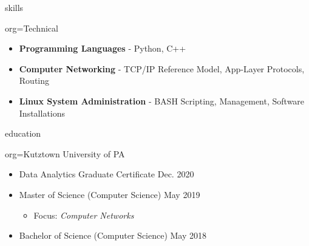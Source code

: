\documentclass{resume}
\begin{document}
\begin{ResumeSection}{skills}
    \newcommand{\skill}[2]{\textbf{#1} - #2}
    \begin{ResumeSubsection}{org=Technical}
        \begin{itemize}
            \item \skill{Programming Languages}{Python, C++}
            \item \skill{Computer Networking}{TCP/IP Reference Model, App-Layer Protocols, Routing}
            \item \skill{Linux System Administration}{BASH Scripting, Management, Software Installations}
        \end{itemize}
    \end{ResumeSubsection}
\end{ResumeSection}

\begin{ResumeSection}{education}
    \begin{ResumeSubsection}{org={Kutztown University of PA}}
        \begin{itemize}
            \item Data Analytics Graduate Certificate \hfill Dec. 2020
            \item Master of Science (Computer Science) \hfill May 2019
            \begin{itemize}
                \item Focus: \emph{Computer Networks}
            \end{itemize}
            \item Bachelor of Science (Computer Science) \hfill May 2018
        \end{itemize}
    \end{ResumeSubsection}
\end{ResumeSection}
\end{document}
